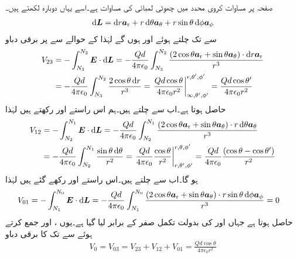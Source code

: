 صفحہ  پر مساوات  کروی محدد میں چھوٹی لمبائی  کی مساوات ہے۔اسے یہاں دوبارہ لکھتے ہیں۔
\begin{align}
\dif \kvec{L}=\dif r \ar+r \dif \theta \atheta+r\sin \theta \dif \phi \aphi
\end{align}
 سے  تک چلتے ہوئے  اور  ہوں گے لہٰذا  کے حوالے سے  پر برقی دباو 
\begin{align*}
V_{23}&=-\int_{N_3}^{N_2} \kvec{E} \cdot \dif \kvec{L}=-\frac{Qd }{4\pi\epsilon_0}\int_{N_3}^{N_2} \frac{( 2 \cos \theta \ar+\sin \theta \atheta)\cdot \dif r \ar}{r^3} \\
&=-\frac{Qd }{4\pi\epsilon_0}\int_{N_3}^{N_2} \frac{ 2 \cos \theta  \dif r }{r^3}=\left .\frac{Q d \cos \theta}{4 \pi \epsilon_0 r^2}\right|_{\infty,\theta',\phi'}^{r,\theta',\phi'}=\frac{Q d \cos \theta'}{4 \pi \epsilon_0 r^2}
\end{align*}
حاصل ہوتا ہے۔اب  سے  چلتے ہیں۔ہم اس راستے  اور  رکھتے ہیں لہٰذا
\begin{align*}
V_{12}&=-\int_{N_2}^{N_1} \kvec{E} \cdot \dif \kvec{L}=-\frac{Qd }{4\pi\epsilon_0}\int_{N_2}^{N_1} \frac{( 2 \cos \theta \ar+\sin \theta \atheta)\cdot  r \dif \theta \atheta}{r^3}  \\
&=-\frac{Qd }{4\pi\epsilon_0}\int_{N_2}^{N_1} \frac{\sin \theta  \dif \theta}{r^2}=\left. \frac{Qd }{4\pi\epsilon_0} \frac{\cos \theta}{r^2}\right|_{r,\theta',\phi'}^{r,\theta,\phi'}=\frac{Qd }{4\pi\epsilon_0} \frac{(\cos \theta-\cos \theta')}{r^2}
\end{align*} 
ہو گا۔اب  سے  چلتے ہیں۔اس راستے  اور  رکھے گئے ہیں لہٰذا
\begin{align*}
V_{01}&=-\int_{N_1}^{N_0} \kvec{E} \cdot \dif \kvec{L}=-\frac{Qd }{4\pi\epsilon_0}\int_{N_1}^{N_0} \frac{( 2 \cos \theta \ar+\sin \theta \atheta)\cdot  r \sin \theta \dif \phi \aphi}{r^3}=0
\end{align*} 
حاصل ہوتا ہے جہاں  اور  کی بدولت تکمل صفر کے برابر لیا گیا ہے۔یوں ،  اور  جمع کرتے ہوئے  سے  تک کا برقی دباو
\begin{align}
V_{0}=V_{03}=V_{23}+V_{12}+V_{01}=\frac{Qd \cos \theta}{4 \pi \epsilon_0 r^2}
\end{align}


